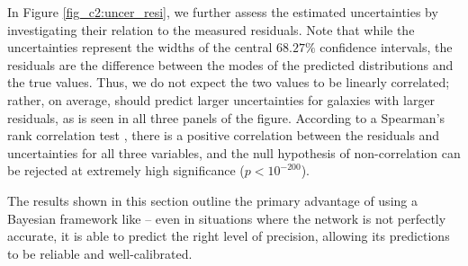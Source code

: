 
In Figure \ref{fig_c2:uncer_resi}, we further assess the estimated uncertainties by investigating their relation to the measured residuals. Note that while the uncertainties represent the widths of the central $68.27\%$ confidence intervals, the residuals are the difference between the modes of the predicted distributions and the true values. Thus, we do not expect the two values to be linearly correlated; rather, on average, \gampen{} should predict larger uncertainties for galaxies with larger residuals, as is seen in all three panels of the figure. 
According to a Spearman's rank correlation test \citep[see][for more details]{spearman}, there is a positive correlation between the residuals and uncertainties for all three variables, and the null hypothesis of non-correlation can be rejected at extremely high significance ($p < 10^{-200}$). 

 
The results shown in this section outline the primary advantage of using a Bayesian framework like \gampen{} -- even in situations where the network is not perfectly accurate, it is able to predict the right level of precision, allowing its predictions to be reliable and well-calibrated.

